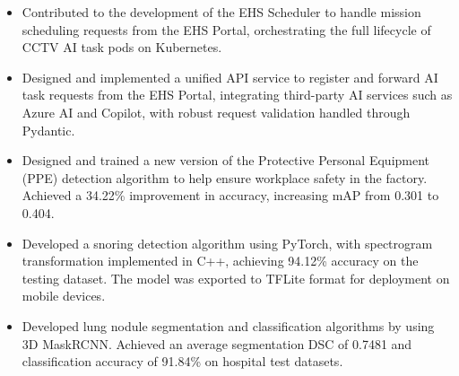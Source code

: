 \begin{cventries}
{\begin{cvitems}
        \begin{itemize}
            \item Contributed to the development of the EHS Scheduler to handle mission scheduling requests from the EHS Portal, 
            orchestrating the full lifecycle of CCTV AI task pods on Kubernetes.
        \end{itemize}
        \begin{itemize}
            \item Designed and implemented a unified API service to register and 
            forward AI task requests from the EHS Portal, integrating third-party 
            AI services such as Azure AI and Copilot, with robust request validation 
            handled through Pydantic.
        \end{itemize}
        \begin{itemize}
            \item Designed and trained a new version of the Protective Personal Equipment (PPE) detection algorithm to help ensure workplace safety in the factory. 
            Achieved a 34.22\% improvement in accuracy, increasing mAP from 0.301 to 0.404.
        \end{itemize}
        \begin{itemize}
            \item Developed a snoring detection algorithm using PyTorch, with spectrogram transformation implemented in C++, achieving 
            94.12\% accuracy on the testing dataset. The model was exported to TFLite format for deployment on mobile devices.
        \end{itemize}
        \begin{itemize}
            \item Developed lung nodule segmentation and classification algorithms by using 3D MaskRCNN. Achieved an average segmentation DSC of 0.7481 and classification accuracy of 91.84\% on hospital test datasets. 
        \end{itemize}
    \end{cvitems}
}

\end{cventries}
